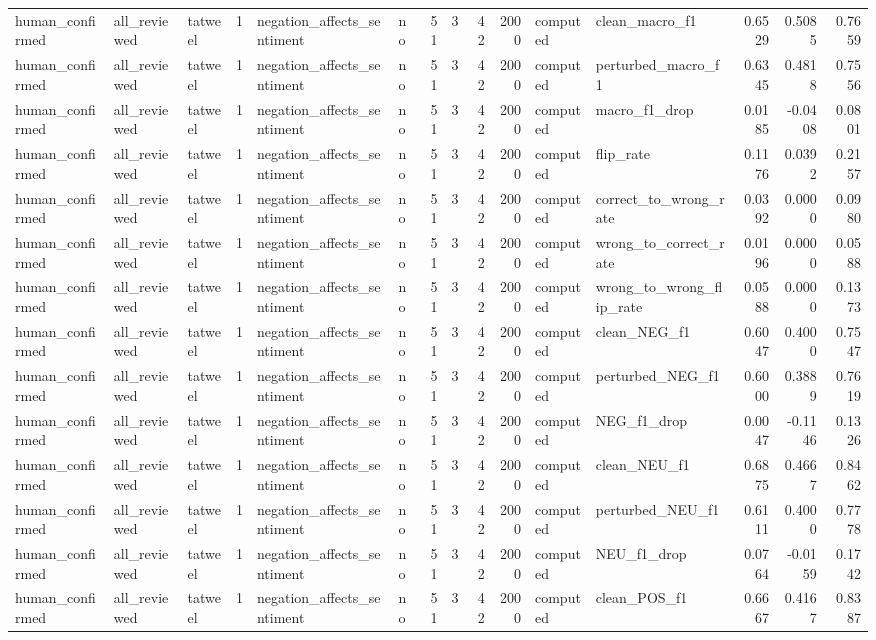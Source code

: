 \begin{tabular}{lllrllrrrrllrrr}
human_confirmed & all_reviewed & tatweel & 1 & negation_affects_sentiment & no & 51 & 3 & 42 & 2000 & computed & clean_macro_f1 & 0.6529 & 0.5085 & 0.7659 \\
human_confirmed & all_reviewed & tatweel & 1 & negation_affects_sentiment & no & 51 & 3 & 42 & 2000 & computed & perturbed_macro_f1 & 0.6345 & 0.4818 & 0.7556 \\
human_confirmed & all_reviewed & tatweel & 1 & negation_affects_sentiment & no & 51 & 3 & 42 & 2000 & computed & macro_f1_drop & 0.0185 & -0.0408 & 0.0801 \\
human_confirmed & all_reviewed & tatweel & 1 & negation_affects_sentiment & no & 51 & 3 & 42 & 2000 & computed & flip_rate & 0.1176 & 0.0392 & 0.2157 \\
human_confirmed & all_reviewed & tatweel & 1 & negation_affects_sentiment & no & 51 & 3 & 42 & 2000 & computed & correct_to_wrong_rate & 0.0392 & 0.0000 & 0.0980 \\
human_confirmed & all_reviewed & tatweel & 1 & negation_affects_sentiment & no & 51 & 3 & 42 & 2000 & computed & wrong_to_correct_rate & 0.0196 & 0.0000 & 0.0588 \\
human_confirmed & all_reviewed & tatweel & 1 & negation_affects_sentiment & no & 51 & 3 & 42 & 2000 & computed & wrong_to_wrong_flip_rate & 0.0588 & 0.0000 & 0.1373 \\
human_confirmed & all_reviewed & tatweel & 1 & negation_affects_sentiment & no & 51 & 3 & 42 & 2000 & computed & clean_NEG_f1 & 0.6047 & 0.4000 & 0.7547 \\
human_confirmed & all_reviewed & tatweel & 1 & negation_affects_sentiment & no & 51 & 3 & 42 & 2000 & computed & perturbed_NEG_f1 & 0.6000 & 0.3889 & 0.7619 \\
human_confirmed & all_reviewed & tatweel & 1 & negation_affects_sentiment & no & 51 & 3 & 42 & 2000 & computed & NEG_f1_drop & 0.0047 & -0.1146 & 0.1326 \\
human_confirmed & all_reviewed & tatweel & 1 & negation_affects_sentiment & no & 51 & 3 & 42 & 2000 & computed & clean_NEU_f1 & 0.6875 & 0.4667 & 0.8462 \\
human_confirmed & all_reviewed & tatweel & 1 & negation_affects_sentiment & no & 51 & 3 & 42 & 2000 & computed & perturbed_NEU_f1 & 0.6111 & 0.4000 & 0.7778 \\
human_confirmed & all_reviewed & tatweel & 1 & negation_affects_sentiment & no & 51 & 3 & 42 & 2000 & computed & NEU_f1_drop & 0.0764 & -0.0159 & 0.1742 \\
human_confirmed & all_reviewed & tatweel & 1 & negation_affects_sentiment & no & 51 & 3 & 42 & 2000 & computed & clean_POS_f1 & 0.6667 & 0.4167 & 0.8387 \\

\end{tabular}
